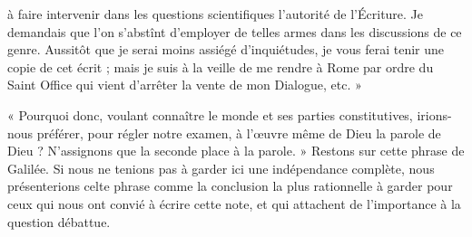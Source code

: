 \documentclass[a4paper, 11pt, oneside]{article}
\begin{document}
à faire intervenir dans les questions scientifiques l'autorité de l'Écriture. Je demandais que l'on s'abstînt d'employer de telles armes dans les discussions de ce genre. Aussitôt que je serai moins assiégé d'inquiétudes, je vous ferai tenir une copie de cet écrit ; mais je suis à la veille de me rendre à Rome par ordre du Saint Office qui vient d'arrêter la vente de mon Dialogue, etc. »

« Pourquoi donc, voulant connaître le monde et ses parties constitutives, irions-nous préférer, pour régler notre examen, à l'œuvre même de Dieu la parole de Dieu ? N'assignons que la seconde place à la parole. » Restons sur cette phrase de Galilée. Si nous ne tenions pas à garder ici une indépendance complète, nous présenterions celte phrase comme la conclusion la plus rationnelle à garder pour ceux qui nous ont convié à écrire cette note, et qui attachent de l'importance à la question débattue.
\clearpage
\end{document}
